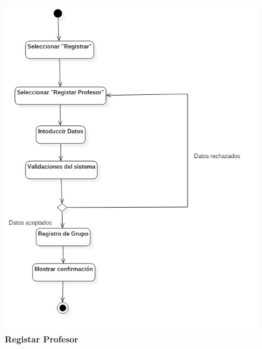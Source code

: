\begin{figure}[H]
  \centering
    \includegraphics[scale=.8,angle=0]{project/Actividades/Registrar_Profesor.jpg}
  \caption{\textbf{Registar Profesor}}
\end{figure}
